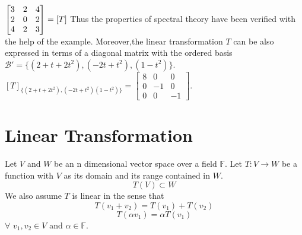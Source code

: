 \documentclass[12pt]{article}
\theoremstyle{definition}
\begin{document}
	  $
	  \begin{bmatrix}
	  3 & 2 & 4\\
	  2 & 0 & 2\\
	  4 & 2 & 3
	  \end{bmatrix} = [T]
	  \\
	  $
	  Thus the properties of spectral theory have been verified with the help of the example.
	  Moreover,the linear transformation $T$ can be also expressed in terms of a diagonal matrix with the ordered basis $\mathcal{B\prime}=\{(2+t+2t^2),(-2t+t^2),(1-t^2)\}$.
	  $
	  {[T]}_{\{(2+t+2t^2),(-2t+t^2)(1-t^2)\}} = 
	  \begin{bmatrix}
	  8 & 0 & 0\\
	  0 & -1 & 0\\
	  0 & 0 & -1
	  \end{bmatrix}
	  $.
	  \section{Linear Transformation}
	  Let $ V $ and $W $ be an n dimensional vector space over a field $ \mathbb{F} $. Let $ T :V\rightarrow W $ be a function with $ V $ as its domain and its range contained in $ W $. $$ T(V)\subset W $$ We also assume $ T $ is linear in the sense that $$ T(v_1 + v_2) = T(v_1)+T(v_2) $$ $$ T(\alpha v_1)=\alpha T(v_1)$$ 
	  $\forall$ $ v_1,v_2 \in V$ and $\alpha\in\mathbb{F}$.\\
	  
\end{document}

